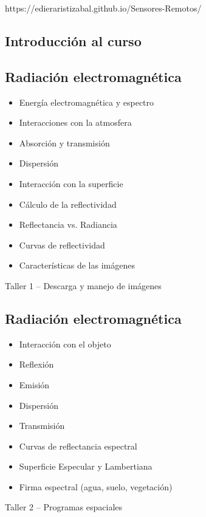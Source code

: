 \documentclass[a4paper,twoside,11pt,]{article}
\begin{document}
https://edieraristizabal.github.io/Sensores-Remotos/

\subsection*{Introducción al curso}

\subsection {Radiación electromagnética}
\begin{itemize}
\item Energía electromagnética y espectro
\item Interacciones con la atmosfera
\item Absorción y transmisión
\item Dispersión
\item Interacción con la superficie
\item Cálculo de la reflectividad
\item Reflectancia vs. Radiancia
\item Curvas de reflectividad
\item Características de las imágenes
\end{itemize}

\begin{tcolorbox}[enhanced,width=5in,center upper,  fontupper=\large\bfseries,drop shadow southwest,sharp corners]
Taller 1 -- Descarga y manejo de imágenes
\end{tcolorbox}

\subsection {Radiación electromagnética}
\begin{itemize}
\item Interacción con el objeto
\item Reflexión
\item Emisión
\item Dispersión
\item Transmisión
\item Curvas de reflectancia espectral
\item Superficie Especular y Lambertiana
\item Firma espectral (agua, suelo, vegetación)
\end{itemize}

\begin{tcolorbox}[enhanced,width=5in,center upper,  fontupper=\large\bfseries,drop shadow southwest,sharp corners]
Taller 2 -- Programas espaciales
\end{tcolorbox}
\end{document}
